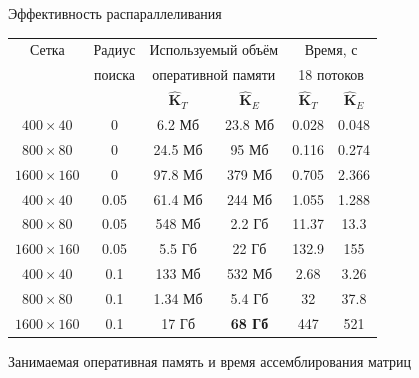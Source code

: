 \begin{frame}{Эффективность распараллеливания}
\tiny
\begin{center}
	\centering
	\begin{tabular}{|c|c|c|c|c|c|}
	\hline
	Сетка & Радиус & \multicolumn{2}{c|}{Используемый объём}   & \multicolumn{2}{c|}{Время, с} \\
	      & поиска & \multicolumn{2}{c|}{оперативной памяти} & \multicolumn{2}{c|}{18 потоков} \\
	\hhline{~~----}
	      &        & $\widehat{\textbf{K}}_T$ & $\widehat{\textbf{K}}_E$ & $\widehat{\textbf{K}}_T$ & $\widehat{\textbf{K}}_E$ \\
	\hline
	$400 \times 40$   & 0    & 6.2 Мб  & 23.8 Мб  & 0.028 & 0.048 \\
	\hline
	$800 \times 80$   & 0    & 24.5 Мб & 95 Мб    & 0.116 & 0.274 \\
	\hline
	$1600 \times 160$ & 0    & 97.8 Мб & 379 Мб   & 0.705 & 2.366 \\
	\hline
	$400 \times 40$   & 0.05 & 61.4 Мб & 244 Мб   & 1.055 & 1.288 \\
	\hline
	$800 \times 80$   & 0.05 & 548 Мб  & 2.2 Гб   & 11.37 & 13.3  \\
	\hline
	$1600 \times 160$ & 0.05 & 5.5 Гб  & 22 Гб    & 132.9 & 155   \\
	\hline
	$400 \times 40$   & 0.1  & 133 Мб  & 532 Мб   & 2.68  & 3.26  \\
	\hline
	$800 \times 80$   & 0.1  & 1.34 Мб & 5.4 Гб   & 32    & 37.8  \\
	\hline
	$1600 \times 160$ & 0.1  & 17 Гб   & \textbf{68 Гб} & 447   & 521   \\
	\hline
	\end{tabular}
	
	\normalsize
	Занимаемая оперативная память и время ассемблирования матриц
\end{center}
\end{frame}


